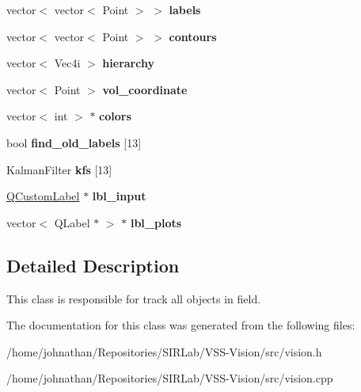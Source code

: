 \begin{DoxyCompactItemize}
\item 
vector$<$ vector$<$ Point $>$ $>$ {\bfseries labels}\hypertarget{classvision_a2a7fa3ec56b81484eb06c0f5c068365a}{}\label{classvision_a2a7fa3ec56b81484eb06c0f5c068365a}

\item 
vector$<$ vector$<$ Point $>$ $>$ {\bfseries contours}\hypertarget{classvision_a77ade58544c4db2587686e73d227cc37}{}\label{classvision_a77ade58544c4db2587686e73d227cc37}

\item 
vector$<$ Vec4i $>$ {\bfseries hierarchy}\hypertarget{classvision_a04a535405c5d7b076299073194f497b4}{}\label{classvision_a04a535405c5d7b076299073194f497b4}

\item 
vector$<$ Point $>$ {\bfseries vol\+\_\+coordinate}\hypertarget{classvision_a4f28ab3ac6e168aa977725da1973399b}{}\label{classvision_a4f28ab3ac6e168aa977725da1973399b}

\item 
vector$<$ int $>$ $\ast$ {\bfseries colors}\hypertarget{classvision_a7a1ac84ff70026be06b4ffe17fb0f3aa}{}\label{classvision_a7a1ac84ff70026be06b4ffe17fb0f3aa}

\item 
bool {\bfseries find\+\_\+old\+\_\+labels} \mbox{[}13\mbox{]}\hypertarget{classvision_a08b91dbb2384d4c6bd78560ec6621246}{}\label{classvision_a08b91dbb2384d4c6bd78560ec6621246}

\item 
Kalman\+Filter {\bfseries kfs} \mbox{[}13\mbox{]}\hypertarget{classvision_a76bf5d0bd645d4db2d9535bacae1284f}{}\label{classvision_a76bf5d0bd645d4db2d9535bacae1284f}

\item 
\hyperlink{classQCustomLabel}{Q\+Custom\+Label} $\ast$ {\bfseries lbl\+\_\+input}\hypertarget{classvision_ae925689fd0bd2eb2fcf2159e2f7b251e}{}\label{classvision_ae925689fd0bd2eb2fcf2159e2f7b251e}

\item 
vector$<$ Q\+Label $\ast$ $>$ $\ast$ {\bfseries lbl\+\_\+plots}\hypertarget{classvision_a4ec174995015376fcc9c15add83ed422}{}\label{classvision_a4ec174995015376fcc9c15add83ed422}

\end{DoxyCompactItemize}


\subsection{Detailed Description}
This class is responsible for track all objects in field. 

The documentation for this class was generated from the following files\+:\begin{DoxyCompactItemize}
\item 
/home/johnathan/\+Repositories/\+S\+I\+R\+Lab/\+V\+S\+S-\/\+Vision/src/vision.\+h\item 
/home/johnathan/\+Repositories/\+S\+I\+R\+Lab/\+V\+S\+S-\/\+Vision/src/vision.\+cpp\end{DoxyCompactItemize}
